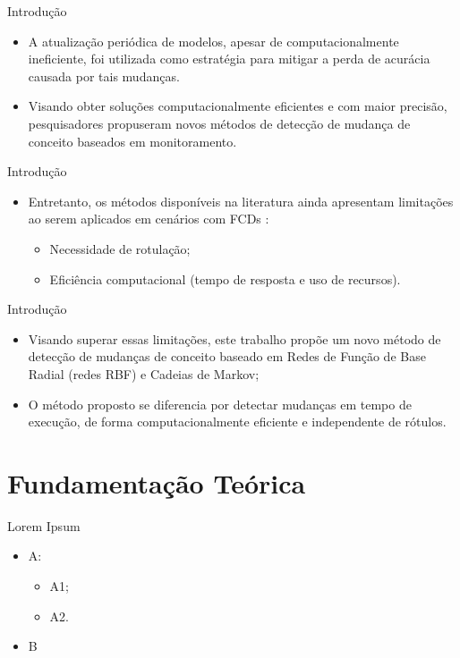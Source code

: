 \documentclass[10pt]{beamer}
\begin{document}
\begin{frame}{Introdução}
    \begin{itemize}
        \item<1 -> A atualização periódica de modelos, apesar de computacionalmente ineficiente, foi utilizada como estratégia para mitigar a perda de acurácia causada por tais mudanças.
        \item<2 -> Visando obter soluções computacionalmente eficientes e com maior precisão, pesquisadores propuseram novos métodos de detecção de mudança de conceito baseados em monitoramento.
      \end{itemize}
\end{frame}


\begin{frame}{Introdução}
    \begin{itemize}
        \item<1 -> Entretanto, os métodos disponíveis na literatura ainda apresentam limitações ao serem aplicados em cenários com FCDs \cite{Aggarwal:2006:DSM:1196418}:
        \begin{itemize}
            \item<2 -> Necessidade de rotulação;
            \item<2 -> Eficiência computacional (tempo de resposta e uso de recursos).
        \end{itemize}
      \end{itemize}
\end{frame}

\begin{frame}{Introdução}
    \begin{itemize}
        \item<1 -> Visando superar essas limitações, este trabalho propõe um novo método de detecção de mudanças de conceito baseado em \alert{Redes de Função de Base Radial (redes RBF) e Cadeias de Markov};
        \item<2 -> O método proposto se diferencia por detectar mudanças em tempo de execução, de forma computacionalmente eficiente e independente de rótulos.
    \end{itemize}
\end{frame}

\section{Fundamentação Teórica}

\begin{frame}{Lorem Ipsum}
    \begin{itemize}
        \item<1 -> A:
        \begin{itemize}
            \item<2 -> A1;
            \item<2 -> A2.
        \end{itemize}
        \item<3 -> B
      \end{itemize}
\end{frame}
\end{document}

